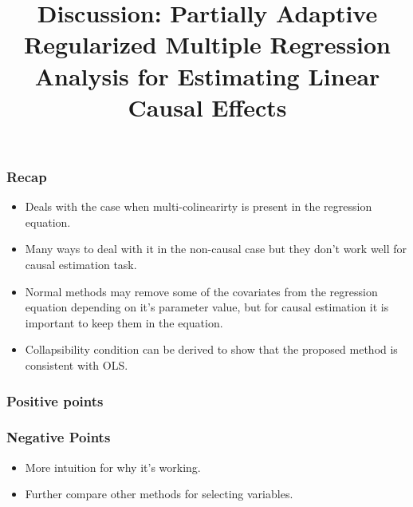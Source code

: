 \documentclass{beamer}
\begin{document}
\title{Discussion: Partially Adaptive Regularized Multiple Regression Analysis for Estimating Linear Causal Effects}

\begin{frame}
	\frametitle{Recap}
	\begin{itemize}
		\item Deals with the case when multi-colinearirty is present in the regression equation.
		\item Many ways to deal with it in the non-causal case but they don't work well for causal estimation task.
		\item Normal methods may remove some of the covariates from the regression equation depending on it's parameter value,
			but for causal estimation it is important to keep them in the equation.
		\item Collapsibility condition can be derived to show that the proposed method is consistent with OLS.
	\end{itemize}
\end{frame}

\begin{frame}
	\frametitle{Positive points}
\end{frame}

\begin{frame}
	\frametitle{Negative Points}
	\begin{itemize}
		\item More intuition for why it's working.
		\item Further compare other methods for selecting variables.
	\end{itemize}
\end{frame}
\end{document}

